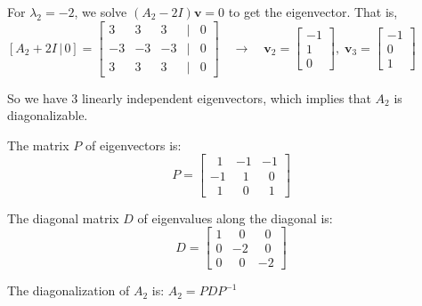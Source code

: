 \documentclass[a4paper,11pt,reqno]{amsart}
\numberwithin{equation}{section}
\begin{document}
\begin{enumerate}
\begin{center}
{{   For \( \lambda_2 = -2 \), we solve \( (A_2 - 2I) \mathbf{v} = 0 \) to get the eigenvector. That is, 
     \[
     [A_2 + 2I\,|\,0] = \begin{bmatrix} 3 & 3 & 3 & | & 0 \\ -3 & -3 & -3 & | & 0 \\ 3 & 3 & 3 & | & 0 \end{bmatrix}
     \quad \to \quad
     \mathbf{v}_2 = \begin{bmatrix} -1 \\ 1 \\ 0 \end{bmatrix}, \;\mathbf{v}_3 = \begin{bmatrix} -1 \\ 0 \\ 1 \end{bmatrix}   \qquad \qquad
     \]

     So we have 3 linearly independent eigenvectors, which implies that \( A_2 \) is diagonalizable.

   The matrix \( P \) of eigenvectors is:
   \[
   P = \begin{bmatrix} 
   \;\;1 & -1 & -1 \\ 
   -1 & \;\;1 & \;\;0 \\ 
   \;\;1 & \;\;0 & \;\;1
   \end{bmatrix}
   \]

   The diagonal matrix \( D \) of eigenvalues along the diagonal is:
   \[
   D = \begin{bmatrix} 
   1 & \;\;0 & \;\;0 \\
   0 & -2 & \;\;0 \\
   0 & \;\;0 & -2 
   \end{bmatrix}
   \]

   The diagonalization of \( A_2 \) is:
   \(
   A_2 = P D P^{-1}
   \)
   
    }}
    \end{center}

\begin{center}\setlength{\fboxsep}{10pt}
\end{center}
\end{enumerate}
\end{document}
